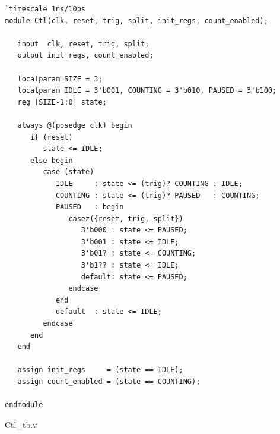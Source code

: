 \documentclass[11pt,a4paper]{article}
\begin{document}
\begin{lstlisting}
`timescale 1ns/10ps
module Ctl(clk, reset, trig, split, init_regs, count_enabled);

   input  clk, reset, trig, split;
   output init_regs, count_enabled;

   localparam SIZE = 3;
   localparam IDLE = 3'b001, COUNTING = 3'b010, PAUSED = 3'b100;
   reg [SIZE-1:0] state;

   always @(posedge clk) begin
      if (reset)
         state <= IDLE;
      else begin
         case (state)
            IDLE     : state <= (trig)? COUNTING : IDLE;
            COUNTING : state <= (trig)? PAUSED   : COUNTING;
            PAUSED   : begin
               casez({reset, trig, split})
                  3'b000 : state <= PAUSED;
                  3'b001 : state <= IDLE;
                  3'b01? : state <= COUNTING;
                  3'b1?? : state <= IDLE;
                  default: state <= PAUSED;
               endcase
            end
            default  : state <= IDLE;
         endcase
      end
   end

   assign init_regs     = (state == IDLE);
   assign count_enabled = (state == COUNTING);

endmodule
\end{lstlisting}

\clearpage
Ctl\_tb.v
\end{document}
